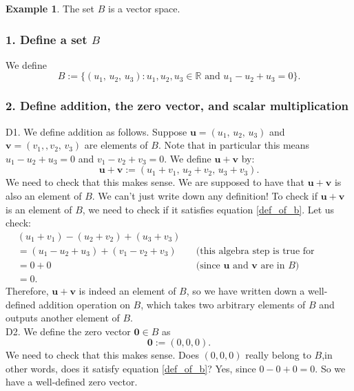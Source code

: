 \documentclass[a4paper,11pt]{book}
\theoremstyle{definition}
\newtheorem{example_environment}{Example}[chapter]
\newcommand{\be}{\begin{equation}}
\newcommand{\ee}{\end{equation}}
\newcommand{\ve}[1]{\mathbf{#1}}
\newenvironment{example}
	{
		\begin{oframed} 
		\begin{example_environment}
	}
	{
		\end{example_environment}
		\end{oframed}
	}
\begin{document}
\begin{example} The set $B$ is a vector space.
\subsubsection{1. Define a set $B$}
We define
\be \label{def_of_b}
 B := \{ (u_1, \, u_2, \, u_3) : u_1, u_2, u_3 \in \mathbb{R} \mbox{ and } u_1 - u_2 + u_3 = 0\} .
\ee

\subsubsection{2. Define addition, the zero vector, and scalar multiplication}
D1. We define addition as follows. Suppose $\ve{u} = (u_1, \, u_2, \, u_3)$ and $\ve{v} = (v_1, , v_2, \, v_3)$ are elements of $B$. Note that in particular this means $u_1 - u_2 + u_3 = 0$ and $v_1 - v_2 + v_3 = 0$. We define $\ve{u} + \ve{v}$ by:
\be \label{def_add_in_B}
 \ve{u} + \ve{v} := (u_1 + v_1, \, u_2 + v_2, \, u_3 + v_3).
\ee
We need to check that this makes sense. We are supposed to have that $\ve{u} + \ve{v}$ is also an element of $B$. We can't just write down any definition! To check if $\ve{u} + \ve{v}$ is an element of $B$, we need to check if it satisfies equation \eqref{def_of_b}. Let us check:
\begin{align*}
 &(u_1 + v_1) - (u_2 + v_2) + (u_3 + v_3) \\
 &= (u_1 - u_2 + u_3) + (v_1 - v_2 + v_3) && \mbox{(this algebra step is true for ordinary numbers)} \\
 &= 0 + 0 && \mbox{(since $\ve{u}$ and $\ve{v}$ are in $B$)} \\
 &= 0.
\end{align*}
Therefore, $\ve{u} + \ve{v}$ is indeed an element of $B$, so we have written down a well-defined addition operation on $B$, which takes two arbitrary elements of $B$ and outputs another element of $B$. \\

\noindent D2. We define the zero vector $\ve{0} \in B$ as
\be \label{zero_vec_in_B}
 \ve{0} := (0, 0, 0).
\ee
We need to check that this makes sense. Does $(0,0,0)$ really belong to $B$,in other words, does it satisfy equation \eqref{def_of_b}? Yes, since $0 - 0 + 0 = 0$. So we have a well-defined zero vector. \\


\end{example}
\end{document}
